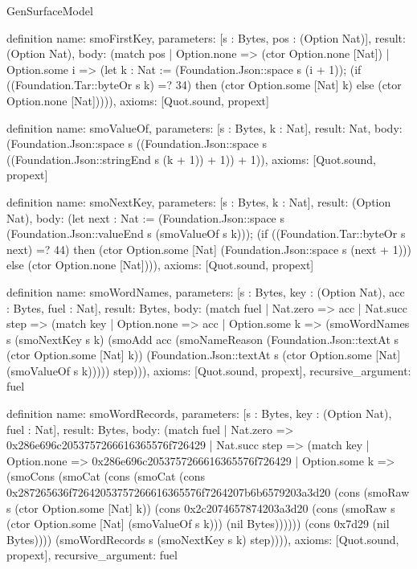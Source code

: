 \begin{lexlean}{GenSurfaceModel}
\begin{semanticmodule}
definition{
  name: smoFirstKey,
  parameters: [s : Bytes, pos : (Option Nat)],
  result: (Option Nat),
  body: (match pos
    | Option.none => (ctor Option.none [Nat])
    | Option.some i => (let k : Nat := (Foundation.Json::space s (i + 1)); (if ((Foundation.Tar::byteOr s k) =? 34) then (ctor Option.some [Nat] k) else (ctor Option.none [Nat])))),
  axioms: [Quot.sound, propext]
}

definition{
  name: smoValueOf,
  parameters: [s : Bytes, k : Nat],
  result: Nat,
  body: (Foundation.Json::space s ((Foundation.Json::space s ((Foundation.Json::stringEnd s (k + 1)) + 1)) + 1)),
  axioms: [Quot.sound, propext]
}

definition{
  name: smoNextKey,
  parameters: [s : Bytes, k : Nat],
  result: (Option Nat),
  body: (let next : Nat := (Foundation.Json::space s (Foundation.Json::valueEnd s (smoValueOf s k))); (if ((Foundation.Tar::byteOr s next) =? 44) then (ctor Option.some [Nat] (Foundation.Json::space s (next + 1))) else (ctor Option.none [Nat]))),
  axioms: [Quot.sound, propext]
}

definition{
  name: smoWordNames,
  parameters: [s : Bytes, key : (Option Nat), acc : Bytes, fuel : Nat],
  result: Bytes,
  body: (match fuel
    | Nat.zero => acc
    | Nat.succ step => (match key
      | Option.none => acc
      | Option.some k => (smoWordNames s (smoNextKey s k) (smoAdd acc (smoNameReason (Foundation.Json::textAt s (ctor Option.some [Nat] k)) (Foundation.Json::textAt s (ctor Option.some [Nat] (smoValueOf s k))))) step))),
  axioms: [Quot.sound, propext],
  recursive_argument: fuel
}

definition{
  name: smoWordRecords,
  parameters: [s : Bytes, key : (Option Nat), fuel : Nat],
  result: Bytes,
  body: (match fuel
    | Nat.zero => 0x286e696c2053757266616365576f726429
    | Nat.succ step => (match key
      | Option.none => 0x286e696c2053757266616365576f726429
      | Option.some k => (smoCons (smoCat (cons (smoCat (cons 0x287265636f72642053757266616365576f7264207b6b6579203a3d20 (cons (smoRaw s (ctor Option.some [Nat] k)) (cons 0x2c2074657874203a3d20 (cons (smoRaw s (ctor Option.some [Nat] (smoValueOf s k))) (nil Bytes)))))) (cons 0x7d29 (nil Bytes)))) (smoWordRecords s (smoNextKey s k) step)))),
  axioms: [Quot.sound, propext],
  recursive_argument: fuel
}


\end{semanticmodule}
\end{lexlean}
